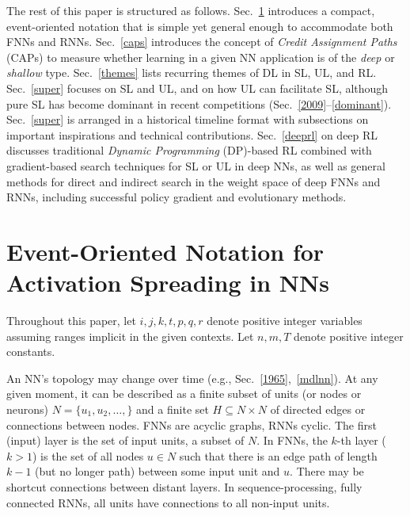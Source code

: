 \documentclass[letterpaper]{article}
\begin{document}
\begin{CJK*}{UTF8}{gbsn}
The rest of this paper is
structured as follows.
Sec.~\ref{notation} introduces
a compact, event-oriented notation that is simple yet general enough to accommodate both
FNNs and RNNs. 
Sec.~\ref{caps} introduces the concept of {\em Credit Assignment Paths} (CAPs) to measure whether learning in a given  NN application is of the {\em deep} or {\em shallow} type.
Sec.~\ref{themes} lists recurring themes of DL in SL, UL, and RL. 
Sec.~\ref{super}  focuses on SL and UL, 
and on how UL can facilitate SL, although pure SL
has become dominant in recent competitions  
(Sec.~\ref{2009}--\ref{dominant}).
Sec.~\ref{super} is arranged in a
historical timeline format with 
subsections on
important inspirations and technical contributions.
Sec.~\ref{deeprl} on deep RL discusses traditional
{\em Dynamic Programming} (DP)-based RL 
combined with gradient-based search techniques for SL or UL in deep NNs, 
as well as general methods for direct and indirect search in the weight space of deep 
FNNs and RNNs, 
including successful policy gradient and evolutionary methods.

 




\section{Event-Oriented Notation for Activation Spreading in NNs}
\label{notation}

Throughout this paper, let $i,j,k,t,p,q,r$ denote positive integer variables
assuming ranges implicit in the given contexts. 
Let $n,m,T$ denote positive integer constants.

An NN's topology may change over time (e.g., Sec.~\ref{1965},~\ref{mdlnn}).
At any given moment, 
it can be described as a finite subset of units (or nodes or neurons)  $N=\{u_1,u_2, \ldots, \}$ and a finite set 
$H \subseteq N \times N$ of directed edges or connections between nodes.
FNNs are acyclic graphs, RNNs cyclic. 
The first (input) layer is the set of input units, a subset of $N$.
In FNNs, the $k$-th layer ($k>1$) is the set of all nodes 
$u \in N$ such that there is an edge path of length $k-1$ (but no longer path) between some input unit and $u$.
There may be shortcut connections between distant layers.
In sequence-processing, fully connected 
 RNNs, all units have connections to all non-input units.




\end{CJK*}
\end{document}
